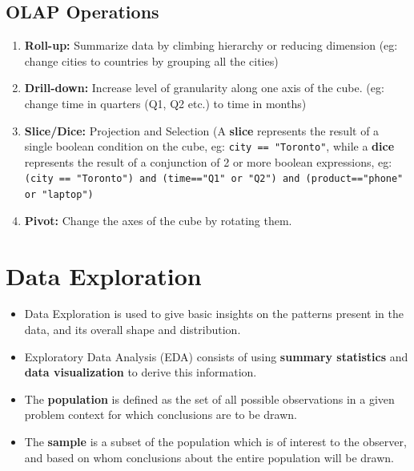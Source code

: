 \documentclass{article}
\theoremstyle{plain}
\theoremstyle{definition}
\begin{document}
\subsection{OLAP Operations}
\begin{enumerate}
    \item \textbf{Roll-up:} Summarize data by climbing hierarchy or reducing dimension (eg: change cities to countries by grouping all the cities)
    
    \item \textbf{Drill-down:} Increase level of granularity along one axis of the cube. (eg: change time in quarters (Q1, Q2 etc.) to time in months) 
    
    \item \textbf{Slice/Dice:} Projection and Selection (A \textbf{slice} represents the result of a single boolean condition on the cube, eg: \texttt{city == "Toronto"}, while a \textbf{dice} represents the result of a conjunction of 2 or more boolean expressions, eg: \texttt{(city == "Toronto") and (time=="Q1" or "Q2") and (product=="phone" or "laptop") }
    
    \item \textbf{Pivot:} Change the axes of the cube by rotating them. 
\end{enumerate}

\section{Data Exploration}

\begin{itemize}
    \item Data Exploration is used to give basic insights on the patterns present in the data, and its overall shape and distribution. 
    
    \item Exploratory Data Analysis (EDA) consists of using \textbf{summary statistics} and \textbf{data visualization} to derive this information. 
    
    \item The \textbf{population} is defined as the set of all possible observations in a given problem context for which conclusions are to be drawn.
    
    \item The \textbf{sample} is a subset of the population which is of interest to the observer, and based on whom conclusions about the entire population will be drawn. 
\end{itemize}
\end{document}
